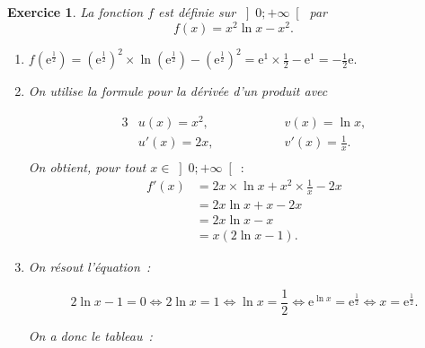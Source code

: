 \documentclass[10pt]{article}
\newtheorem{exo}{Exercice}
\begin{document}
\begin{exo}

La fonction $f$ est définie sur $\left]0;+\infty\right[$ par
\[f(x)=x^2\ln x-x^2.\]

\begin{enumerate}
\item $f\left(\text{e}^{\frac{1}{2}}\right)=\left(\text{e}^{\frac{1}{2}}\right)^2\times \ln\left(\text{e}^{\frac{1}{2}}\right)-\left(\text{e}^{\frac{1}{2}}\right)^2=\text{e}^{1}\times \frac{1}{2}-\text{e}^{1}=-\frac{1}{2}\text{e}.$
\item On utilise la formule pour la dérivée d'un produit avec



\begin{alignat*}{3}
&u(x)=x^2,&& \hspace{1cm}&&v(x)=\ln x, \\
& u'(x)=2x,&& &&v'(x)=\frac{1}{x}.\\
\end{alignat*}
On obtient, pour tout $x\in \left]0;+\infty\right[~:$
\begin{align*}f'(x)&=2x\times \ln x+x^2\times \frac{1}{x}-2x\\
&=2x\ln x+x-2x\\
&=2x\ln x-x\\
&=x(2\ln x-1).
\end{align*}
\item 
On résout l'équation~:

\[2\ln x-1=0\iff 2\ln x=1\iff \ln x=\frac{1}{2}\iff
\text{e}^{\ln x}=\text{e}^{\frac{1}{2}}\iff
x=\text{e}^{\frac{1}{2}}.\]


On a donc le tableau~:

\medskip
\begin{center}
\end{center}
\end{enumerate}



\end{exo}
\end{document}
